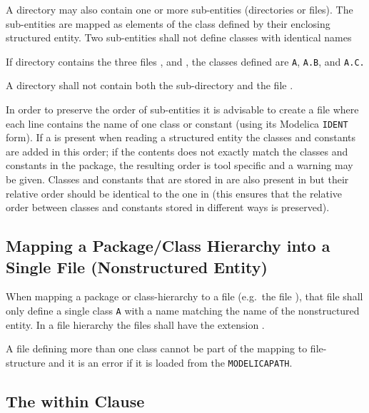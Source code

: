 A directory may also contain one or more sub-entities (directories or
files). The sub-entities are mapped as elements of the class defined by
their enclosing structured entity.  Two sub-entities shall not define classes with identical names

\begin{example}
If directory  contains the three files ,  and , the classes defined are \lstinline!A!,
\lstinline!A.B!, and \lstinline!A.C.!
\end{example}

\begin{example}
A directory shall not contain both the sub-directory  and the file .
\end{example}

In order to preserve the order of sub-entities it is advisable to create
a file  where each line contains the name of one class or
constant (using its Modelica \lstinline!IDENT! form). If a  is present when reading a structured entity
the classes and constants are added in this order; if the contents does
not exactly match the classes and constants in the package, the
resulting order is tool specific and a warning may be given. Classes and
constants that are stored in  are also present in
 but their relative order should be identical to the one in
 (this ensures that the relative order between classes and
constants stored in different ways is preserved).

\subsection{Mapping a Package/Class Hierarchy into a Single File (Nonstructured Entity)}\label{mapping-a-package-class-hierarchy-into-a-single-file-nonstructured-entity}

When mapping a package or class-hierarchy to a file (e.g.\ the file ), that file shall only define a single class \lstinline!A! with a
name matching the name of the nonstructured entity. In a file hierarchy the files shall have the extension .

A  file defining more than one class cannot be part of the mapping
to file-structure and it is an error if it is loaded from the
\lstinline!MODELICAPATH!.

\subsection{The within Clause}\label{the-within-clause}

